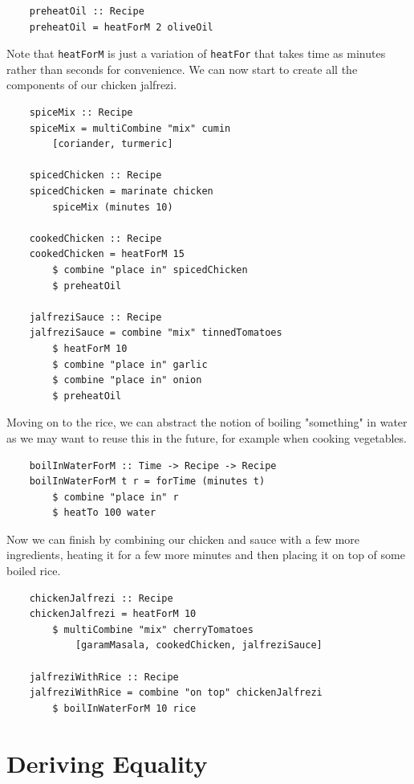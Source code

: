 \documentclass[11pt]{article}
\begin{document}
\begin{lstlisting}
    preheatOil :: Recipe
    preheatOil = heatForM 2 oliveOil
\end{lstlisting}

Note that \texttt{heatForM} is just a variation of \texttt{heatFor} that takes time as
minutes rather than seconds for convenience. We can now start to create all the
components of our chicken jalfrezi.

\begin{lstlisting}
    spiceMix :: Recipe
    spiceMix = multiCombine "mix" cumin
        [coriander, turmeric]

    spicedChicken :: Recipe
    spicedChicken = marinate chicken
        spiceMix (minutes 10)

    cookedChicken :: Recipe
    cookedChicken = heatForM 15
        $ combine "place in" spicedChicken
        $ preheatOil

    jalfreziSauce :: Recipe
    jalfreziSauce = combine "mix" tinnedTomatoes
        $ heatForM 10
        $ combine "place in" garlic
        $ combine "place in" onion
        $ preheatOil
\end{lstlisting}

Moving on to the rice, we can abstract the notion of boiling "something" in water as we may
want to reuse this in the future, for example when cooking vegetables.

\begin{lstlisting}
    boilInWaterForM :: Time -> Recipe -> Recipe
    boilInWaterForM t r = forTime (minutes t) 
        $ combine "place in" r
        $ heatTo 100 water
\end{lstlisting}

Now we can finish by combining our chicken and sauce with a few more ingredients,
heating it for a few more minutes and then placing it on top of some boiled rice.

\begin{lstlisting}
    chickenJalfrezi :: Recipe
    chickenJalfrezi = heatForM 10
        $ multiCombine "mix" cherryTomatoes
            [garamMasala, cookedChicken, jalfreziSauce]

    jalfreziWithRice :: Recipe
    jalfreziWithRice = combine "on top" chickenJalfrezi
        $ boilInWaterForM 10 rice
\end{lstlisting}

\section{Deriving Equality}
\end{document}

